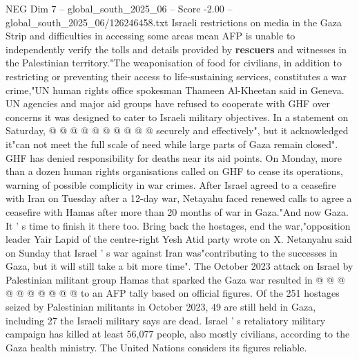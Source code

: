 \begin{textsample}{NEG Dim 7 – global\_south\_2025\_06 – Score -2.00 – global\_south\_2025\_06/126246458.txt}
Israeli restrictions on media in the Gaza Strip and difficulties in accessing some areas mean AFP is unable to independently verify the tolls and details provided by \textbf{rescuers} and witnesses in the Palestinian territory."The weaponisation of food for civilians, in addition to restricting or preventing their access to life-sustaining services, constitutes a war crime,"UN human rights office spokesman Thameen Al-Kheetan said in Geneva.
UN agencies and major aid groups have refused to cooperate with GHF over concerns it was designed to cater to Israeli military objectives.
In a statement on Saturday, @ @ @ @ @ @ @ @ @ @ securely and effectively", but it acknowledged it"can not meet the full scale of need while large parts of Gaza remain closed".
GHF has denied responsibility for deaths near its aid points.
On Monday, more than a dozen human rights organisations called on GHF to cease its operations, warning of possible complicity in war crimes.
After Israel agreed to a ceasefire with Iran on Tuesday after a 12-day war, Netayahu faced renewed calls to agree a ceasefire with Hamas after more than 20 months of war in Gaza."And now Gaza.
It ' s time to finish it there too.
Bring back the hostages, end the war,"opposition leader Yair Lapid of the centre-right Yesh Atid party wrote on X.
Netanyahu said on Sunday that Israel ' s war against Iran was"contributing to the successes in Gaza, but it will still take a bit more time".
The October 2023 attack on Israel by Palestinian militant group Hamas that sparked the Gaza war resulted in @ @ @ @ @ @ @ @ @ @ to an AFP tally based on official figures.
Of the 251 hostages seized by Palestinian militants in October 2023, 49 are still held in Gaza, including 27 the Israeli military says are dead.
Israel ' s retaliatory military campaign has killed at least 56,077 people, also mostly civilians, according to the Gaza health ministry.
The United Nations considers its figures reliable.

\end{textsample}
